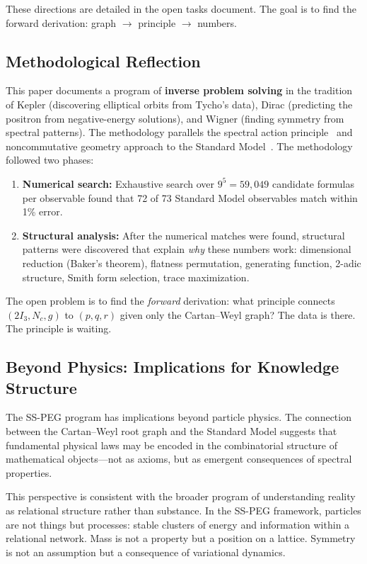 These directions are detailed in the open tasks document. The goal is to find the forward derivation: graph $\to$ principle $\to$ numbers.

\subsection{Methodological Reflection}\label{sec:methodology_reflection}

This paper documents a program of \textbf{inverse problem solving} in the tradition of Kepler (discovering elliptical orbits from Tycho's data), Dirac (predicting the positron from negative-energy solutions), and Wigner (finding symmetry from spectral patterns). The methodology parallels the spectral action principle~\cite{chamseddine1997spectral} and noncommutative geometry approach to the Standard Model~\cite{connes1994noncommutative}. The methodology followed two phases:

\begin{enumerate}
\item \textbf{Numerical search:} Exhaustive search over $9^5 = 59{,}049$ candidate formulas per observable found that 72 of 73 Standard Model observables match within 1\% error.
\item \textbf{Structural analysis:} After the numerical matches were found, structural patterns were discovered that explain \textit{why} these numbers work: dimensional reduction (Baker's theorem), flatness permutation, generating function, 2-adic structure, Smith form selection, trace maximization.
\end{enumerate}

The open problem is to find the \textit{forward} derivation: what principle connects $(2I_3, N_c, g)$ to $(p, q, r)$ given only the Cartan--Weyl graph? The data is there. The principle is waiting.

\subsection{Beyond Physics: Implications for Knowledge Structure}\label{sec:beyond_physics}

The SS-PEG program has implications beyond particle physics. The connection between the Cartan--Weyl root graph and the Standard Model suggests that fundamental physical laws may be encoded in the combinatorial structure of mathematical objects---not as axioms, but as emergent consequences of spectral properties.

This perspective is consistent with the broader program of understanding reality as relational structure rather than substance. In the SS-PEG framework, particles are not things but processes: stable clusters of energy and information within a relational network. Mass is not a property but a position on a lattice. Symmetry is not an assumption but a consequence of variational dynamics.

